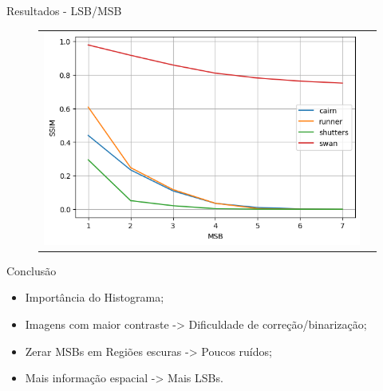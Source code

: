 \documentclass[]{beamer}
\begin{document}
\begin{frame}{Resultados - LSB/MSB}
\begin{figure}
\begin{tabular}{cc}
         \includegraphics[scale=0.3]{Imagens/resultados-msb-ssim.png} \\
    \end{tabular}
\end{figure}
\end{frame}

\begin{frame}{Conclusão}

\begin{itemize}
    \item Importância do Histograma;
    \item Imagens com maior contraste -> Dificuldade de correção/binarização;
    \item Zerar MSBs em Regiões escuras -> Poucos ruídos;
    \item Mais informação espacial -> Mais LSBs.
\end{itemize}

\end{frame}
\end{document}
